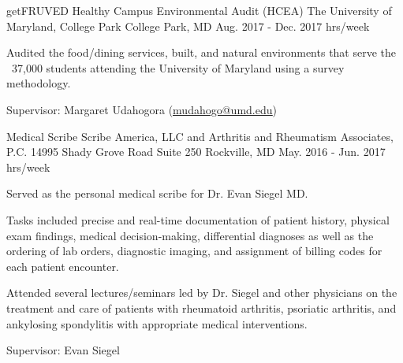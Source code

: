 \begin{cventries}

  \cventry
    {getFRUVED Healthy Campus Environmental Audit (HCEA) } %
    {The University of Maryland, College Park} %
    {College Park, MD} %
    {Aug. 2017 - Dec. 2017  hrs/week} %
    {
      \begin{cvitems} %
        \item {Audited the food/dining services, built, and natural environments that serve the ~37,000 students attending the University of Maryland using a survey methodology.}
        \item{Supervisor: Margaret Udahogora (\textcolor{navyblue}{
        {\underline{\href{mailto:mudahogo@umd.edu}{mudahogo@umd.edu}}}})}
      \end{cvitems}
    }

  \cventry
    {Medical Scribe} %
    {Scribe America, LLC and Arthritis and Rheumatism Associates, P.C.} %
    {14995 Shady Grove Road \newline Suite 250 \newline Rockville, MD} %
    {May. 2016 - Jun. 2017  hrs/week} %
    {
      \begin{cvitems} %
        \item {Served as the personal medical scribe for Dr. Evan Siegel MD.}
        \item{Tasks included precise and real-time documentation of patient history, physical exam findings, medical decision-making, differential diagnoses as well as the ordering of lab orders, diagnostic imaging, and assignment of billing codes for each patient encounter.}
        \item{Attended several lectures/seminars led by Dr. Siegel and other physicians on the treatment and care of patients with rheumatoid arthritis, psoriatic arthritis, and ankylosing spondylitis with appropriate medical interventions.}
        \item{Supervisor: Evan Siegel}
      \end{cvitems}
    }


\end{cventries}
